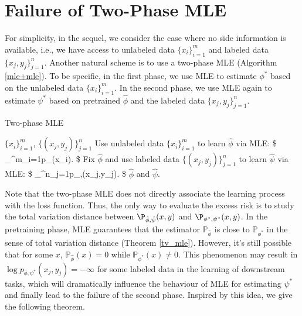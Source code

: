 \section{Failure of Two-Phase MLE}\label{counter_example}

For simplicity, in the sequel, we consider the case where no side information is available, i.e., we have access to unlabeled data $\{x_i\}^m_{i=1}$ and labeled data $\{x_j,y_j\}^n_{j=1}$.  Another natural scheme is to use a two-phase MLE (Algorithm \ref{mle+mle}). To be specific, in the first phase, we use MLE to estimate $\phi^* $ based on the unlabeled data $\{x_i\}^m_{i=1}$. In the second phase, we use MLE again to estimate $\psi^* $ based on pretrained $\hat\phi$ and the labeled data $\{x_j,y_j\}^{n}_{j=1}$. 


\begin{algorithm}[H]
\caption{Two-phase MLE}\label{mle+mle}
\begin{algorithmic}[1]
 $\{x_i\}^m_{i=1}$, $\{(x_j,y_j)\}^n_{j=1}$
\STATE Use unlabeled data $\{x_i\}^m_{i=1}$ to learn $\hat\phi$ via MLE:
\$
\hat\phi\leftarrow\argmax_{\phi\in\Phi}\sum^m_{i=1}\log p_{\phi}(x_i).
\$
\STATE Fix $\hat\phi$ and use labeled data $\{(x_j,y_j)\}^n_{j=1}$ to learn $\hat\psi$ via MLE:
\$
\hat\psi\leftarrow\argmax_{\psi\in\Psi}\sum^n_{j=1}\log p_{\hat\phi,\psi}(x_j,y_j).
\$
 $\hat\phi$ and $\hat\psi$.
\end{algorithmic}
\end{algorithm}


Note that the two-phase MLE does not directly associate the learning process with the loss function. Thus, the only way to evaluate the excess risk is to study the total variation distance between $\P_{\hat\phi, \hat\psi}(x,y)$ and $\P_{\phi^* ,\psi^* }(x,y)$. In the pretraining phase, MLE guarantees that the estimator $\mathbb{P}_{\hat{\phi}}$ is close to $\mathbb{P}_{\phi^{*}}$ in the sense of total variation distance (Theorem \ref{tv_mle}). However, it's still possible that for some $x$, $\mathbb{P}_{\hat{\phi}}(x)=0$ while $\mathbb{P}_{\phi^{*}}(x) \neq 0$. This phenomenon may result in $\log p_{\hat\phi,\psi^* }(x_j,y_j)=-\infty$ for some labeled data in the learning of downstream tasks, which will dramatically influence the behaviour of MLE for estimating $\psi^{*}$ and finally lead to the failure of the second phase. Inspired by this idea, we give the following theorem.



